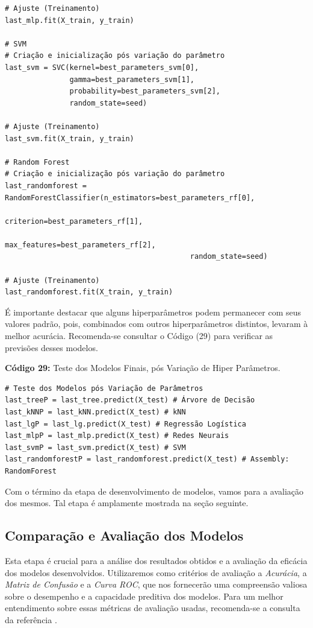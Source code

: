 \documentclass[a4paper,12pt]{article} %
\begin{document}
\begin{center}
\begin{verbatim}
# Ajuste (Treinamento)
last_mlp.fit(X_train, y_train)

# SVM
# Criação e inicialização pós variação do parâmetro
last_svm = SVC(kernel=best_parameters_svm[0],
               gamma=best_parameters_svm[1],
               probability=best_parameters_svm[2],
               random_state=seed)

# Ajuste (Treinamento)
last_svm.fit(X_train, y_train)

# Random Forest
# Criação e inicialização pós variação do parâmetro
last_randomforest = RandomForestClassifier(n_estimators=best_parameters_rf[0],
                                           criterion=best_parameters_rf[1],
                                           max_features=best_parameters_rf[2],
                                           random_state=seed)

# Ajuste (Treinamento)
last_randomforest.fit(X_train, y_train)
\end{verbatim}
\end{center}

É importante destacar que alguns hiperparâmetros podem permanecer com seus valores padrão, pois, combinados com outros hiperparâmetros distintos, levaram à melhor acurácia. Recomenda-se consultar o Código (29) para verificar as previsões desses modelos.

\begin{center}
\textbf{Código 29:} Teste dos Modelos Finais, pós Variação de Hiper Parâmetros.
\begin{verbatim}
# Teste dos Modelos pós Variação de Parâmetros
last_treeP = last_tree.predict(X_test) # Árvore de Decisão
last_kNNP = last_kNN.predict(X_test) # kNN
last_lgP = last_lg.predict(X_test) # Regressão Logística
last_mlpP = last_mlp.predict(X_test) # Redes Neurais
last_svmP = last_svm.predict(X_test) # SVM
last_randomforestP = last_randomforest.predict(X_test) # Assembly: RandomForest
\end{verbatim}
\end{center}

Com o término da etapa de desenvolvimento de modelos, vamos para a avaliação dos mesmos. Tal etapa é amplamente mostrada na seção seguinte.

\subsection{Comparação e Avaliação dos Modelos}
Esta etapa é crucial para a análise dos resultados obtidos e a avaliação da eficácia dos modelos desenvolvidos. Utilizaremos como critérios de avaliação a \textit{Acurácia}, a \textit{Matriz de Confusão} e a \textit{Curva ROC}, que nos fornecerão uma compreensão valiosa sobre o desempenho e a capacidade preditiva dos modelos. Para um melhor entendimento sobre essas métricas de avaliação usadas, recomenda-se a consulta da referência \cite{metricas}.
\end{document}
